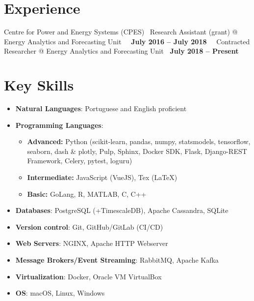 \documentclass{mycv}
\begin{document}
\section{Experience}

	\vspace{-0.1cm}
	
	{Centre for Power and Energy Systems (CPES) }
	{\textbullet~Research Assistant (grant) \hspace{0.38cm} @ \hspace{0.02cm} Energy Analytics and Forecasting Unit \hfill ~\textbf{\ July 2016 -- July 2018\ }}
	{\textbullet~Contracted Researcher \hspace{1cm}  @ \hspace{0.02cm} Energy Analytics and Forecasting Unit \hfill \textbf{ \ July 2018 -- Present\ }}	
	
	\vspace{0.4cm}

\section{Key Skills}

\begin{itemize}
	
	\item \textbf{Natural Languages}: Portuguese and English proficient
	
	\item \textbf{Programming Languages}: 
	\begin{itemize}
		\item \textbf{Advanced:} Python (scikit-learn, pandas, numpy, statsmodels, tensorflow, seaborn, dash \& plotly, Pulp, Sphinx, Docker SDK, Flask, Django-REST Framework, Celery, pytest, loguru)
		\item \textbf{Intermediate:} JavaScript (VueJS), Tex (\LaTeX)
		\item \textbf{Basic:} GoLang, R, MATLAB, C, C++
	\end{itemize}			
	
	\item \textbf{Databases}: PostgreSQL (+TimescaleDB), Apache Cassandra, SQLite
	
	\item \textbf{Version control}: Git, GitHub/GitLab (CI/CD)
	
	\item \textbf{Web Servers}: NGINX, Apache HTTP Webserver
	
		\item \textbf{Message Brokers/Event Streaming}: RabbitMQ, Apache Kafka
	
	\item \textbf{Virtualization}: Docker, Oracle VM VirtualBox
	
	\item \textbf{OS}: macOS, Linux, Windows
	
	
\end{itemize}
\end{document}

